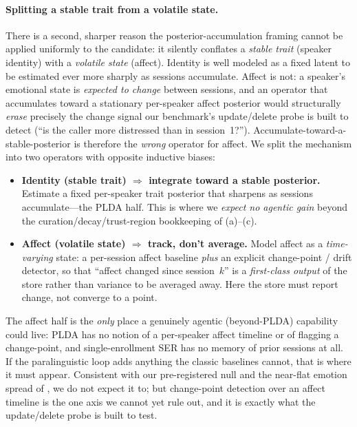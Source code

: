 \paragraph{Splitting a stable trait from a volatile state.} There is a second, sharper reason the posterior-accumulation framing cannot be applied uniformly to the candidate: it silently conflates a \emph{stable trait} (speaker identity) with a \emph{volatile state} (affect). Identity is well modeled as a fixed latent to be estimated ever more sharply as sessions accumulate. Affect is not: a speaker's emotional state is \emph{expected to change} between sessions, and an operator that accumulates toward a stationary per-speaker affect posterior would structurally \emph{erase} precisely the change signal our benchmark's update/delete probe is built to detect (``is the caller more distressed than in session~1?''). Accumulate-toward-a-stable-posterior is therefore the \emph{wrong} operator for affect. We split the mechanism into two operators with opposite inductive biases:
\begin{itemize}
  \item \textbf{Identity (stable trait) $\Rightarrow$ integrate toward a stable posterior.} Estimate a fixed per-speaker trait posterior that sharpens as sessions accumulate---the PLDA half. This is where we \emph{expect no agentic gain} beyond the curation/decay/trust-region bookkeeping of (a)--(c).
  \item \textbf{Affect (volatile state) $\Rightarrow$ track, don't average.} Model affect as a \emph{time-varying} state: a per-session affect baseline \emph{plus} an explicit change-point / drift detector, so that ``affect changed since session~$k$'' is a \emph{first-class output} of the store rather than variance to be averaged away. Here the store must report change, not converge to a point.
\end{itemize}
The affect half is the \emph{only} place a genuinely agentic (beyond-PLDA) capability could live: PLDA has no notion of a per-speaker affect timeline or of flagging a change-point, and single-enrollment SER has no memory of prior sessions at all. If the paralinguistic loop adds anything the classic baselines cannot, that is where it must appear. Consistent with our pre-registered null and the near-flat emotion spread of , we do not expect it to; but change-point detection over an affect timeline is the one axis we cannot yet rule out, and it is exactly what the update/delete probe is built to test.

